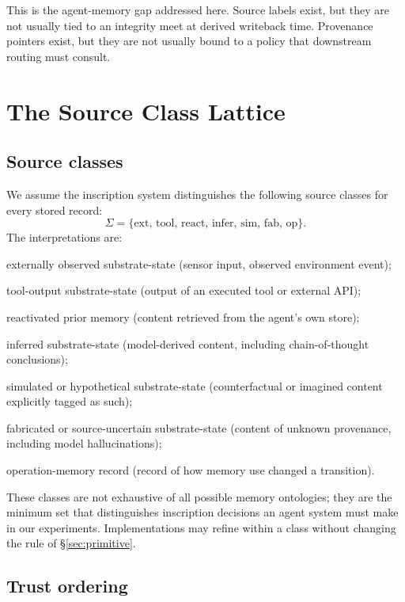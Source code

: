 \documentclass[11pt]{article}
\newcommand{\SourceSet}{\Sigma}
\newcommand{\ext}{\ensuremath{\mathrm{ext}}}
\newcommand{\tool}{\ensuremath{\mathrm{tool}}}
\newcommand{\react}{\ensuremath{\mathrm{react}}}
\newcommand{\infer}{\ensuremath{\mathrm{infer}}}
\newcommand{\simsrc}{\ensuremath{\mathrm{sim}}}
\newcommand{\fab}{\ensuremath{\mathrm{fab}}}
\newcommand{\op}{\ensuremath{\mathrm{op}}}
\begin{document}
This is the agent-memory gap addressed here. Source labels exist, but they are not usually tied to an integrity meet at derived writeback time. Provenance pointers exist, but they are not usually bound to a policy that downstream routing must consult.

\section{The Source Class Lattice}
\label{sec:lattice}

\subsection{Source classes}

We assume the inscription system distinguishes the following source classes for every stored record:
\begin{equation}
\SourceSet = \{\ext,\, \tool,\, \react,\, \infer,\, \simsrc,\, \fab,\, \op\}.
\end{equation}
The interpretations are:
\begin{description}[font=\normalfont\itshape]
\item[\ext] externally observed substrate-state (sensor input, observed environment event);
\item[\tool] tool-output substrate-state (output of an executed tool or external API);
\item[\react] reactivated prior memory (content retrieved from the agent's own store);
\item[\infer] inferred substrate-state (model-derived content, including chain-of-thought conclusions);
\item[\simsrc] simulated or hypothetical substrate-state (counterfactual or imagined content explicitly tagged as such);
\item[\fab] fabricated or source-uncertain substrate-state (content of unknown provenance, including model hallucinations);
\item[\op] operation-memory record (record of how memory use changed a transition).
\end{description}
These classes are not exhaustive of all possible memory ontologies; they are the minimum set that distinguishes inscription decisions an agent system must make in our experiments. Implementations may refine within a class without changing the rule of \S\ref{sec:primitive}.

\subsection{Trust ordering}
\end{document}

